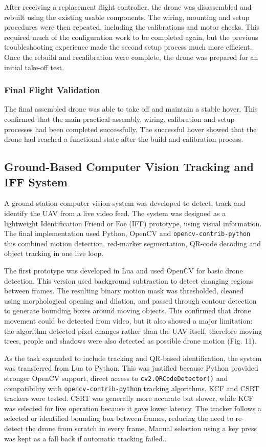 \documentclass[conference]{IEEEtran}
\begin{document}
After receiving a replacement flight controller, the drone was disassembled and rebuilt using the existing usable components. The wiring, mounting and setup procedures were then repeated, including the calibrations and motor checks. This required much of the configuration work to be completed again, but the previous troubleshooting experience made the second setup process much more efficient. Once the rebuild and recalibration were complete, the drone was prepared for an initial take-off test.


\subsubsection*{Final Flight Validation}

The final assembled drone was able to take off and maintain a stable hover. This confirmed that the main practical assembly, wiring, calibration and setup processes had been completed successfully. The successful hover showed that the drone had reached a functional state after the build and calibration process.

\subsection*{Ground-Based Computer Vision Tracking and IFF System}
A ground-station computer vision system was developed to detect, track and identify the UAV from a live video feed. The system was designed as a lightweight Identification Friend or Foe (IFF) prototype, using visual information. The final implementation used Python, OpenCV and \texttt{opencv-contrib-python} this combined motion detection, red-marker segmentation, QR-code decoding and object tracking in one live loop.

The first prototype was developed in Lua and used OpenCV for basic drone detection. This version used background subtraction to detect changing regions between frames. The resulting binary motion mask was thresholded, cleaned using morphological opening and dilation, and passed through contour detection to generate bounding boxes around moving objects. This confirmed that drone movement could be detected from video, but it also showed a major limitation: the algorithm detected pixel changes rather than the UAV itself, therefore moving trees, people and shadows were also detected as possible drone motion (Fig. 11).

As the task expanded to include tracking and QR-based identification, the system was transferred from Lua to Python. This was justified because Python provided stronger OpenCV support, direct access to \texttt{cv2.QRCodeDetector()} and compatibility with \texttt{opencv-contrib-python} tracking algorithms. KCF and CSRT trackers were tested. CSRT was generally more accurate but slower, while KCF was selected for live operation because it gave lower latency. The tracker follows a selected or identified bounding box between frames, reducing the need to re-detect the drone from scratch in every frame. Manual selection using a key press was kept as a fall back if automatic tracking failed..
\end{document}
